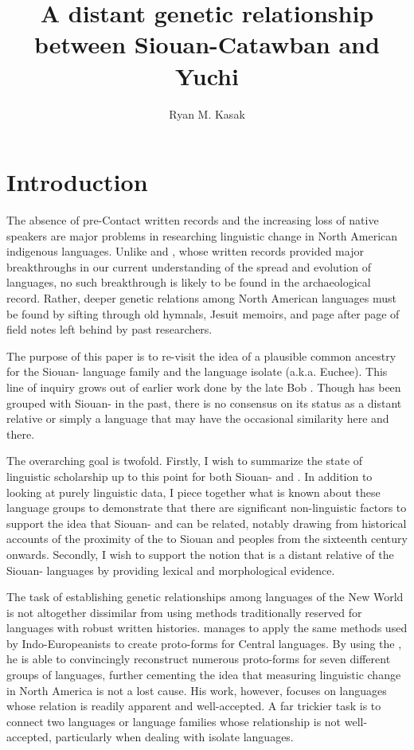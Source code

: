 \documentclass[output=paper]{LSP/langsci}
\author{Ryan M. Kasak}
\title{A distant genetic relationship between {Siouan-Catawban} and {Yuchi}}
\begin{document}
\section{Introduction}\label{sec:kasak:1}

The absence of pre-Contact written records and the increasing loss of native speakers are major problems in researching linguistic change in North American indigenous languages. Unlike  and , whose written records provided major breakthroughs in our current understanding of the spread and evolution of  languages, no such breakthrough is likely to be found in the archaeological record. Rather, deeper genetic relations among North American languages must be found by sifting through old hymnals, Jesuit memoirs, and page after page of field notes left behind by past researchers.

The purpose of this paper is to re-visit the idea of a plausible common ancestry for the Siouan- language family and the language isolate  (a.k.a. Euchee). This line of inquiry grows out of earlier work done by the late Bob \citet{Rankin1996,Rankin1998scy}. Though  has been grouped with Siouan- in the past, there is no consensus on its status as a distant relative or simply a language that may have the occasional similarity here and there.

The overarching goal is twofold. Firstly, I wish to summarize the state of linguistic scholarship up to this point for both Siouan- and . In addition to looking at purely linguistic data, I piece together what is known about these language groups to demonstrate that there are significant non-linguistic factors to support the idea that Siouan- and  can be related, notably drawing from historical accounts of the proximity of the  to Siouan and  peoples from the sixteenth century onwards. Secondly, I wish to support the notion that  is a distant relative of the Siouan- languages by providing lexical and morphological evidence.

The task of establishing genetic relationships among languages of the New World is not altogether dissimilar from using methods traditionally reserved for languages with robust written histories. \citet{Bloomfield1925} manages to apply the same methods used by Indo-Europeanists to create proto-forms for Central  languages. By using the , he is able to convincingly reconstruct numerous proto-forms for seven different groups of  languages, further cementing the idea that measuring linguistic change in North America is not a lost cause. His work, however, focuses on languages whose relation is readily apparent and well-accepted. A far trickier task is to connect two languages or language families whose relationship is not well-accepted, particularly when dealing with isolate languages. 
\end{document}
